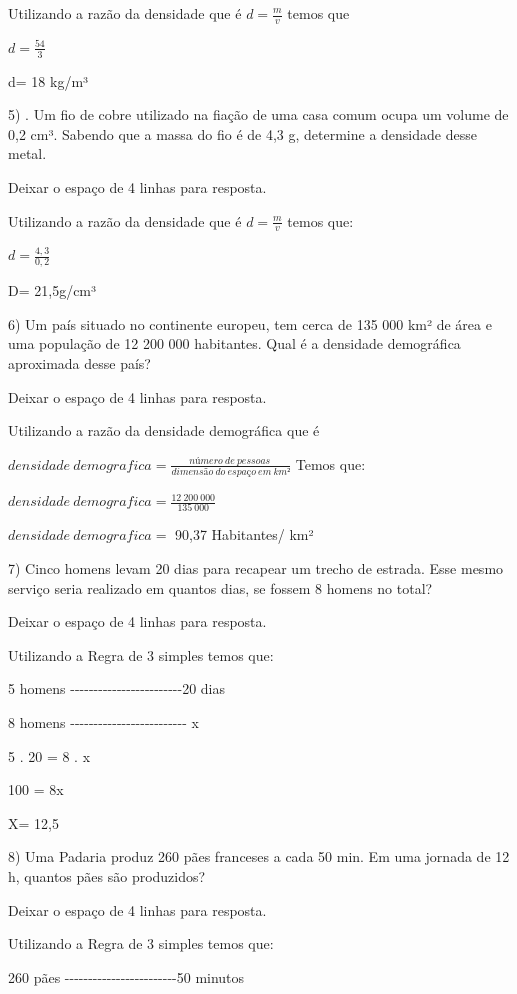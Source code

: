 Utilizando a razão da densidade que é \(d = \frac{m}{v}\) temos que

\(d = \frac{54}{3}\)

d= 18 kg/m³

5) . Um fio de cobre utilizado na fiação de uma casa comum ocupa um
volume de 0,2 cm³. Sabendo que a massa do fio é de 4,3 g, determine a
densidade desse metal.

Deixar o espaço de 4 linhas para resposta.

Utilizando a razão da densidade que é \(d = \frac{m}{v}\) temos que:

\(d = \frac{4,3}{0,2}\)

D= 21,5g/cm³

6) Um país situado no continente europeu, tem cerca de 135 000 km² de
área e uma população de 12 200 000 habitantes. Qual é a densidade
demográfica aproximada desse país?

Deixar o espaço de 4 linhas para resposta.

Utilizando a razão da densidade demográfica que é

\(densidade\ demografica = \frac{número\ de\ pessoas\ }{dimensão\ do\ espaço\ em\ km²}\)
Temos que:

\(densidade\ demografica = \frac{12\ 200\ 000}{135\ 000}\)

\(densidade\ demografica =\) 90,37 Habitantes/ km²

7) Cinco homens levam 20 dias para recapear um trecho de estrada. Esse
mesmo serviço seria realizado em quantos dias, se fossem 8 homens no
total?

Deixar o espaço de 4 linhas para resposta.

Utilizando a Regra de 3 simples temos que:

5 homens
-\/-\/-\/-\/-\/-\/-\/-\/-\/-\/-\/-\/-\/-\/-\/-\/-\/-\/-\/-\/-\/-\/-\/-20
dias

8 homens
-\/-\/-\/-\/-\/-\/-\/-\/-\/-\/-\/-\/-\/-\/-\/-\/-\/-\/-\/-\/-\/-\/-\/-\/-
x

5 . 20 = 8 . x

100 = 8x

X= 12,5

8) Uma Padaria produz 260 pães franceses a cada 50 min. Em uma jornada
de 12 h, quantos pães são produzidos?

Deixar o espaço de 4 linhas para resposta.

Utilizando a Regra de 3 simples temos que:

260 pães
-\/-\/-\/-\/-\/-\/-\/-\/-\/-\/-\/-\/-\/-\/-\/-\/-\/-\/-\/-\/-\/-\/-\/-50
minutos

